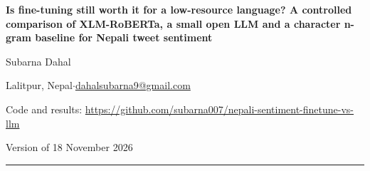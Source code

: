 \documentclass[11pt,a4paper]{article}
\begin{document}
\begin{center}
{\LARGE\bfseries Is fine-tuning still worth it for a low-resource language? A controlled comparison of XLM-RoBERTa, a small open LLM and a character n-gram baseline for Nepali tweet sentiment\par}
\vspace{1.0em}
{\large Subarna Dahal\par}
\vspace{0.3em}
{\small Lalitpur, Nepal\quad$\cdot$\quad \href{mailto:dahalsubarna9@gmail.com}{dahalsubarna9@gmail.com}\par}
{\small Code and results: \url{https://github.com/subarna007/nepali-sentiment-finetune-vs-llm}\par}
\vspace{0.3em}
{\small Version of 18 November 2026\par}
\end{center}
\vspace{0.4em}
\noindent\rule{\textwidth}{0.4pt}
\end{document}
